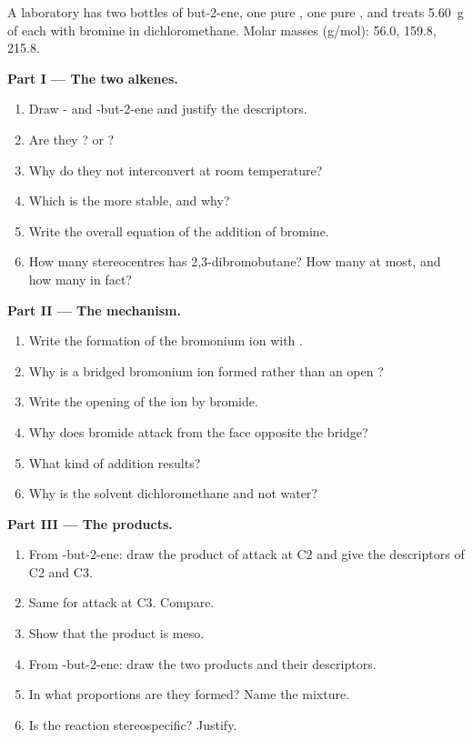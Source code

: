 \begin{problem}
\label{pb:b1:electrophilic-additions:1}
A laboratory has two bottles of but-2-ene, one pure , one pure
, and treats \qty{5.60}{g} of each with bromine in
dichloromethane. Molar masses (\unit{g/mol}):  56.0, 
159.8,  215.8.

\medskip
\noindent\textbf{Part I --- The two alkenes.}
\begin{enumerate}
  \item Draw - and -but-2-ene and justify the descriptors.
  \item Are they ?  or ?
  \item Why do they not interconvert at room temperature?
  \item Which is the more stable, and why?
  \item Write the overall equation of the addition of bromine.
  \item How many stereocentres has 2,3-dibromobutane? How many
         at most, and how many in fact?
\end{enumerate}

\medskip
\noindent\textbf{Part II --- The mechanism.}
\begin{enumerate}[resume]
  \item Write the formation of the bromonium ion with .
  \item Why is a bridged bromonium ion formed rather than an open
        ?
  \item Write the opening of the ion by bromide.
  \item Why does bromide attack from the face opposite the bridge?
  \item What kind of addition results?
  \item Why is the solvent dichloromethane and not water?
\end{enumerate}

\medskip
\noindent\textbf{Part III --- The products.}
\begin{enumerate}[resume]
  \item From -but-2-ene: draw the product of attack at C2 and give
        the descriptors of C2 and C3.
  \item Same for attack at C3. Compare.
  \item Show that the product is meso.
  \item From -but-2-ene: draw the two products and their
        descriptors.
  \item In what proportions are they formed? Name the mixture.
  \item Is the reaction stereospecific? Justify.
\end{enumerate}


\end{problem}
